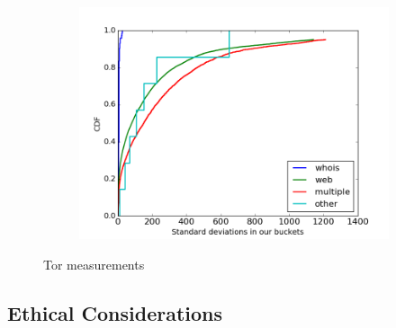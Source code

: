 \begin{figure}
	\begin{subfigure}[t]{0.32\textwidth}
		\centering
		\includegraphics[scale=0.3]{images/stddevs.png}
		\label{fig:stats_c}
	\end{subfigure}
	\label{fig:measurements}
	\caption{Tor measurements}
\end{figure}
\subsection{Ethical Considerations}
